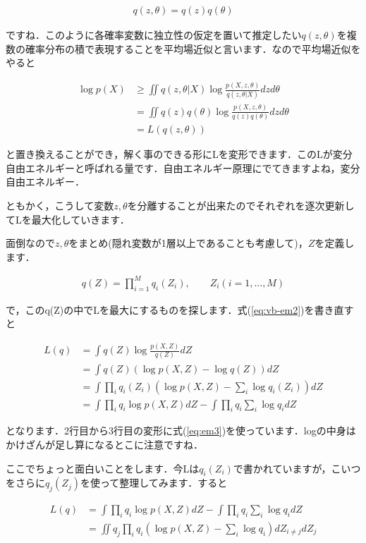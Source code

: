\documentclass[11pt,a4paper]{ujreport}
\begin{document}
\begin{align}
  q(z,\theta) = q(z)q(\theta)
\end{align}

ですね．このように各確率変数に独立性の仮定を置いて推定したい$q(z,θ)$を複数の確率分布の積で表現することを平均場近似と言います．なので平均場近似をやると

\begin{align}
  \log p(X) &
  \geq \iint q(z,\theta|X) \log \frac{p(X,z,\theta)}{q(z,\theta|X)}dzd\theta\nonumber\\
  &= \iint q(z)q(\theta) \log \frac{p(X,z,\theta)}{q(z)q(\theta)}dzd\theta\nonumber\\
  &= L(q(z,\theta))
  \label{eq:vb-em2}
\end{align}

と置き換えることができ，解く事のできる形にLを変形できます．このLが変分自由エネルギーと呼ばれる量です．自由エネルギー原理にでてきますよね，変分自由エネルギー．

ともかく，こうして変数$z,\theta$を分離することが出来たのでそれぞれを逐次更新してLを最大化していきます．

面倒なので$z,\theta$をまとめ(隠れ変数が1層以上であることも考慮して)，$Z$を定義します．

\begin{align}
  q(Z) = \prod_{i=1}^M q_i(Z_i), \qquad Z_i(i=1,...,M)
  \label{eq:vb-em3}
\end{align}

で，このq(Z)の中でLを最大にするものを探します．式(\ref{eq:vb-em2})を書き直すと

\begin{align}
  L(q) &= \int q(Z)\log \frac{p(X,Z)}{q(Z)}dZ\\
  &= \int q(Z)(\log p(X,Z)-\log q(Z))dZ\\
  &= \int \prod_i q_i(Z_i)(\log p(X,Z)- \sum_i \log q_i(Z_i))dZ\\
  &= \int \prod_i q_i \log p(X,Z)dZ - \int \prod_i q_i\sum_i \log q_i dZ
\end{align}

となります．2行目から3行目の変形に式(\ref{eq:em3})を使っています．logの中身はかけざんが足し算になるとこに注意ですね．

ここでちょっと面白いことをします．今Lは$q_i(Z_i)$で書かれていますが，こいつをさらに$q_j(Z_j)$を使って整理してみます．すると

\begin{align}
  L(q) &= \int \prod_i q_i \log p(X,Z)dZ - \int \prod_i q_i\sum_i \log q_i dZ\\
  &=\iint q_j\prod_i q_i (\log p(X,Z) - \sum_i \log q_i) dZ_{i \neq j}dZ_j
\end{align}
\end{document}
